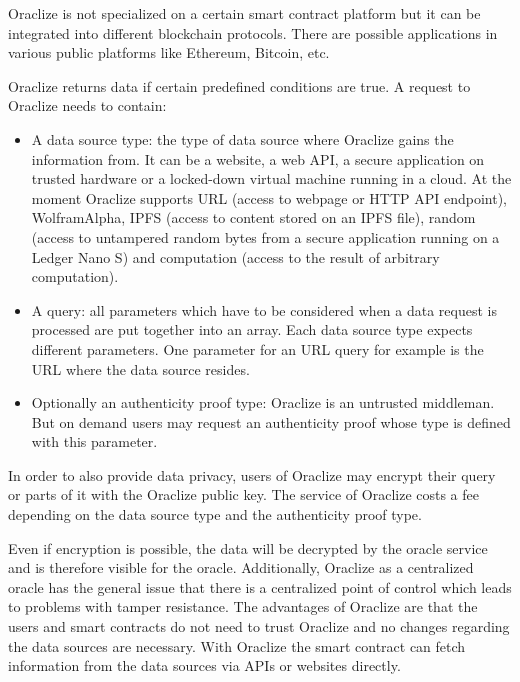 \documentclass[conference]{IEEEtran}
\begin{document}
Oraclize is not specialized on a certain smart contract platform but it can be integrated into different blockchain protocols. There are possible applications in various public platforms like Ethereum, Bitcoin, etc. \cite{Oraclize2017} \par 
Oraclize returns data if certain predefined conditions are true. A request to Oraclize needs to contain:
\begin{itemize}
	\item A data source type: the type of data source where Oraclize gains the information from. It can be a website, a web API, a secure application on trusted hardware or a locked-down virtual machine running in a cloud. At the moment Oraclize supports URL (access to  webpage or HTTP API endpoint), WolframAlpha, IPFS (access to content stored on an IPFS file), random (access to untampered random bytes from a secure application running on a Ledger Nano S) and computation (access to the result of arbitrary computation).
	\item A query: all parameters which have to be considered when a data request is processed are put together into an array. Each data source type expects different parameters. One parameter for an URL query for example is the URL where the data source resides.
	\item Optionally an authenticity proof type: Oraclize is an untrusted middleman. But on demand users may request an authenticity proof whose type is defined with this parameter. \cite{Oraclize2017}
\end{itemize}
In order to also provide data privacy, users of Oraclize may encrypt their query or parts of it with the Oraclize public key. The service of Oraclize costs a fee depending on the data source type and the authenticity proof type. \cite{Oraclize2017} \par
Even if encryption is possible, the data will be decrypted by the oracle service and is therefore visible for the oracle. Additionally, Oraclize as a centralized oracle has the general issue that there is a centralized point of control which leads to problems with tamper resistance. The advantages of Oraclize are that the users and smart contracts do not need to trust Oraclize and no changes regarding the data sources are necessary. With Oraclize the smart contract can fetch information from the data sources via APIs or websites directly. \cite{Ellis2017} \cite{Oraclize2017} \par    
\end{document}
